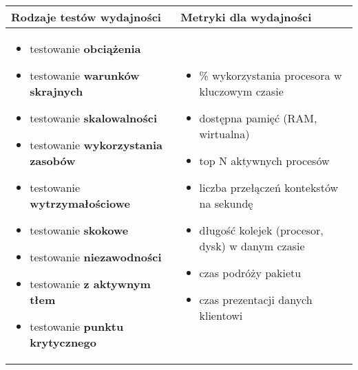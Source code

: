 \documentclass[../main.tex]{subfiles}
\begin{document}
    \begin{table}[H]
        \begin{center}
            \begin{tabular}{ p{8cm} | p{8cm} }
                \textbf{Rodzaje testów} wydajności & \textbf{Metryki} dla wydajności\\
                \hline
                \begin{itemize}
                    \item testowanie \textbf{obciążenia}
                    \item testowanie \textbf{warunków skrajnych}
                    \item testowanie \textbf{skalowalności}
                    \item testowanie \textbf{wykorzystania zasobów}
                    \item testowanie \textbf{wytrzymałościowe}
                    \item testowanie \textbf{skokowe}
                    \item testowanie \textbf{niezawodności}
                    \item testowanie \textbf{z aktywnym tłem}
                    \item testowanie \textbf{punktu krytycznego}
                \end{itemize}
                &
                \begin{itemize}
                    \item \% wykorzystania procesora w kluczowym czasie
                    \item dostępna pamięć (RAM, wirtualna)
                    \item top N aktywnych procesów
                    \item liczba przełączeń kontekstów na sekundę
                    \item długość kolejek (procesor, dysk) w danym czasie
                    \item czas podróży pakietu
                    \item czas prezentacji danych klientowi
                \end{itemize}\\
            \end{tabular}
        \end{center}
    \end{table}
\end{document}

